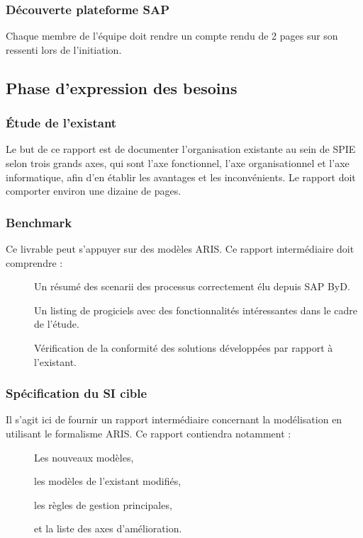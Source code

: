 \subsubsection{Découverte plateforme SAP}

Chaque membre de l’équipe doit rendre un compte rendu de 2 pages sur son ressenti lors de l’initiation.

\subsection{Phase d’expression des besoins}

\subsubsection{Étude de l'existant}

Le but de ce rapport est de documenter l’organisation existante au sein de SPIE selon trois grands axes, qui sont l’axe fonctionnel, l’axe organisationnel et l’axe informatique, afin d’en établir les avantages et les inconvénients.\newline
Le rapport doit comporter environ une dizaine de pages.

\subsubsection{Benchmark}

Ce livrable peut s'appuyer sur des modèles ARIS. Ce rapport intermédiaire doit comprendre : \\

\begin{description}
    \item[\textbullet] Un résumé des scenarii des processus correctement élu depuis SAP ByD.
    \item[\textbullet] Un listing de progiciels avec des fonctionnalités intéressantes dans le cadre de l’étude.
    \item[\textbullet] Vérification de la conformité des solutions développées par rapport à l’existant.
\end{description}

\subsubsection{Spécification du SI cible}

Il s’agit ici de fournir un rapport intermédiaire concernant la modélisation en utilisant le formalisme ARIS. Ce rapport contiendra notamment : \\
\begin{description}
    \item[\textbullet] Les nouveaux modèles,
    \item[\textbullet] les modèles de l'existant modifiés,
    \item[\textbullet] les règles de gestion principales,
    \item[\textbullet] et la liste des axes d'amélioration.
\end{description}

